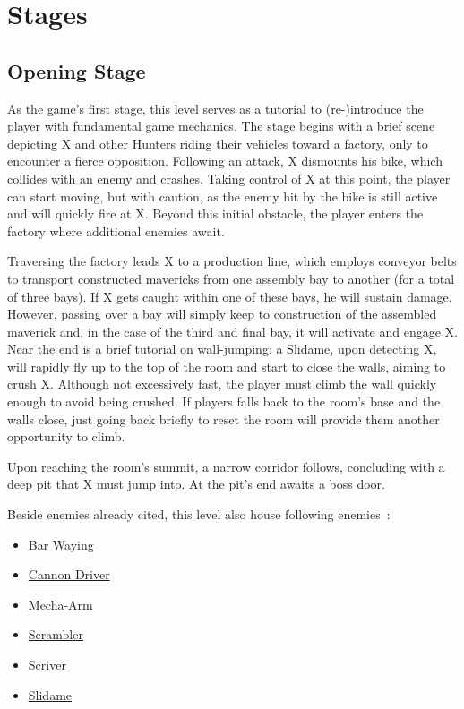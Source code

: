 \chapter{Stages}	

\section{Opening Stage}
As the game's first stage, this level serves as a tutorial to (re-)introduce the player with fundamental game mechanics. The stage begins with a brief scene depicting X and other Hunters riding their vehicles toward a factory, only to encounter a fierce opposition. Following an attack, X dismounts his bike, which collides with an enemy and crashes. Taking control of X at this point, the player can start moving, but with caution, as the enemy hit by the bike is still active and will quickly fire at X. Beyond this initial obstacle, the player enters the factory where additional enemies await.

Traversing the factory leads X to a production line, which employs conveyor belts to transport constructed mavericks from one assembly bay to another (for a total of three bays). If X gets caught within one of these bays, he will sustain damage. However, passing over a bay will simply keep to construction of the assembled maverick and, in the case of the third and final bay, it will activate and engage X. Near the end is a brief tutorial on wall-jumping: a \hyperlink{enem:Slidame}{Slidame}, upon detecting X, will rapidly fly up to the top of the room and start to close the walls, aiming to crush X. Although not excessively fast, the player must climb the wall quickly enough to avoid being crushed. If players falls back to the room's base and the walls close, just going back briefly to reset the room  will provide them another opportunity to climb.

Upon reaching the room's summit, a narrow corridor follows, concluding with a deep pit that X must jump into. At the pit's end awaits a boss door.

Beside enemies already cited, this level also house following enemies~\cite{wiki:X2_opening}:
\begin{itemize}
	\item \hyperlink{enem:Bar_Waying}{Bar Waying}
	\item \hyperlink{enem:Cannon_Driver}{Cannon Driver}
	\item \hyperlink{enem:Mecha-Arm}{Mecha-Arm}
	\item \hyperlink{enem:Scrambler}{Scrambler}
	\item \hyperlink{enem:Scriver}{Scriver}
	\item \hyperlink{enem:Slidame}{Slidame}
\end{itemize}

